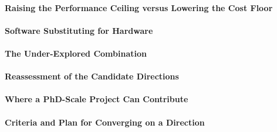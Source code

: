 \paragraph{Raising the Performance Ceiling versus Lowering the Cost Floor}

\paragraph{Software Substituting for Hardware}

\paragraph{The Under-Explored Combination}

\paragraph{Reassessment of the Candidate Directions}

\paragraph{Where a PhD-Scale Project Can Contribute}

\paragraph{Criteria and Plan for Converging on a Direction}
